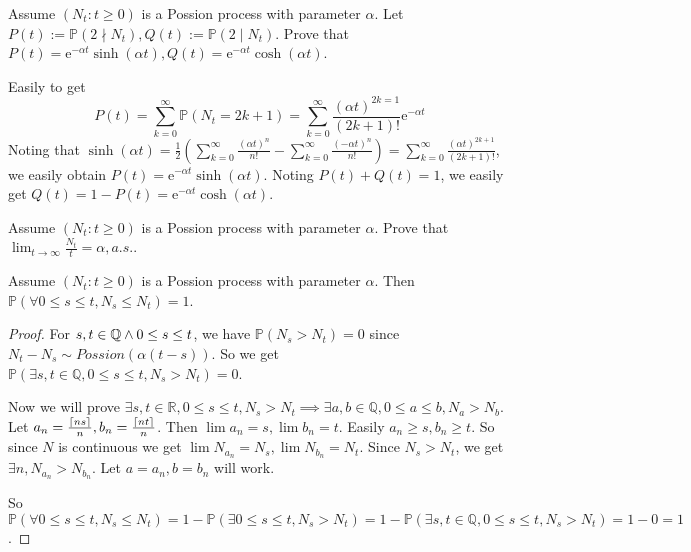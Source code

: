 \documentclass[../main]{subfiles}
\begin{document}
\begin{problem}\label{pro:1}
  Assume \((N_t:t \geq 0)\) is a Possion process with parameter \(\alpha\).
  Let \(P(t):=\mathbb{P}(2 \nmid N_t),Q(t):=\mathbb{P}(2 \mid N_t)\).
  Prove that \(P(t)=\mathrm{e}^{-\alpha t}\sinh(\alpha t),Q(t)=\mathrm{e}^{-\alpha t}\cosh(\alpha t)\).
\end{problem}
\begin{solution}
  Easily to get
  \[
    P(t)=\sum_{k=0}^{\infty}\mathbb{P}(N_t=2k+1)=\sum_{k=0}^{\infty}\frac{(\alpha t)^{2k=1}}{(2k+1)!}\mathrm{e}^{-\alpha t}
  \]
  Noting that \(\sinh(\alpha t)=\frac{1}{2}\left(\sum_{k=0}^{\infty}\frac{(\alpha t)^n}{n!}-\sum_{k=0}^{\infty}\frac{(-\alpha t)^n}{n!}\right)=\sum_{k=0}^{\infty}\frac{(\alpha t)^{2k+1}}{(2k+1)!}\),
  we easily obtain \(P(t)=\mathrm{e}^{-\alpha t}\sinh(\alpha t)\).
  Noting \(P(t)+ Q(t)=1\), we easily get \(Q(t)=1-P(t)=\mathrm{e}^{-\alpha t}\cosh(\alpha t)\).
\end{solution}
\begin{problem}\label{pro:2}
  Assume \((N_t:t \geq 0)\) is a Possion process with parameter \(\alpha\).
  Prove that \(\lim_{t \to \infty}\frac{N_t}{t}=\alpha,a.s.\).
\end{problem}
\begin{lemma}\label{lem:1}
  Assume \((N_t:t \geq 0)\) is a Possion process with parameter \(\alpha\).
  Then \(\mathbb{P}(\forall 0 \leq s \leq t,N_s \leq N_t)=1\).
\end{lemma}
\begin{proof}
  For \(s,t \in \mathbb{Q} \wedge 0 \leq s \leq t\), we have \(\mathbb{P}(N_s > N_t)=0\) since \(N_t - N_s \sim Possion(\alpha(t-s))\).
  So we get \(\mathbb{P}(\exists s,t \in \mathbb{Q},0 \leq s \leq t,N_s>N_t)=0\).

  Now we will prove \(\exists s,t \in \mathbb{R},0 \leq s \leq t,N_s>N_t \implies \exists a,b \in \mathbb{Q},0 \leq a \leq b,N_a > N_b\).
  Let \(a_n= \frac{\left\lceil ns \right\rceil}{n},b_n=\frac{\left\lceil nt \right\rceil}{n}\). Then \(\lim a_n=s,\lim b_n=t\). Easily \(a_n \geq s,b_n \geq t\).
  So since \(N\) is continuous we get \(\lim N_{a_n}=N_s,\lim N_{b_n}=N_t\).
  Since \(N_s>N_t\), we get \(\exists n,N_{a_n}>N_{b_n}\). Let \(a=a_n,b=b_n\) will work.

  So \(\mathbb{P}(\forall 0 \leq s \leq t,N_s \leq N_t)=1-\mathbb{P}(\exists 0 \leq s \leq t,N_s>N_t)=1-\mathbb{P}(\exists s,t \in \mathbb{Q},0 \leq s \leq t,N_s>N_t)=1-0=1\).
\end{proof}
\end{document}
